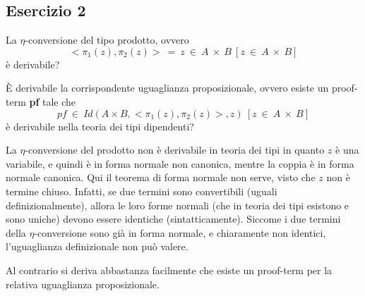\subsection{Esercizio 2}
\begin{thm}
	La $\eta$-conversione del tipo prodotto, ovvero
	\[<\pi_1(z),\pi_2(z)>~=~z~\in~A~\times~B~[z~\in~A~\times~B]\]
	è derivabile?
	
	È derivabile la corrispondente uguaglianza proposizionale, ovvero esiste un proof-term \textbf{pf} tale che
	\[pf~\in~Id(A\times B,<\pi_1(z),\pi_2(z)>,z)~[z~\in~A~\times~B]\]
	è derivabile nella teoria dei tipi dipendenti?
\end{thm}
La $\eta$-conversione del prodotto non è derivabile in teoria dei tipi in quanto $z$ è una variabile, e quindi è in forma normale non canonica, mentre la coppia è in forma normale canonica. Qui il teorema di forma normale non serve, visto che $z$ non è termine chiuso. Infatti, se due termini sono convertibili (uguali definizionalmente), allora le loro forme normali (che in teoria dei tipi esistono e sono uniche) devono essere identiche (sintatticamente). Siccome i due termini della $\eta$-conversione sono già in forma normale, e chiaramente non identici, l’uguaglianza definizionale non può valere.

Al contrario si deriva abbastanza facilmente che esiste un proof-term per la relativa uguaglianza proposizionale.
